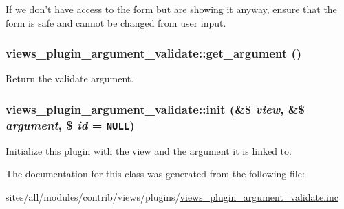 If we don't have access to the form but are showing it anyway, ensure that the form is safe and cannot be changed from user input. \hypertarget{classviews__plugin__argument__validate_a5ce3161f5f33df417719506c1613446}{
\subsubsection[{get\_\-argument}]{\setlength{\rightskip}{0pt plus 5cm}views\_\-plugin\_\-argument\_\-validate::get\_\-argument ()}}
\label{classviews__plugin__argument__validate_a5ce3161f5f33df417719506c1613446}


Return the validate argument. \hypertarget{classviews__plugin__argument__validate_d3a9fbaccf486d38039340ce03fd577a}{
\subsubsection[{init}]{\setlength{\rightskip}{0pt plus 5cm}views\_\-plugin\_\-argument\_\-validate::init (\&\$ {\em view}, \/  \&\$ {\em argument}, \/  \$ {\em id} = {\tt NULL})}}
\label{classviews__plugin__argument__validate_d3a9fbaccf486d38039340ce03fd577a}


Initialize this plugin with the \hyperlink{classview}{view} and the argument it is linked to. 

The documentation for this class was generated from the following file:\begin{CompactItemize}
\item 
sites/all/modules/contrib/views/plugins/\hyperlink{views__plugin__argument__validate_8inc}{views\_\-plugin\_\-argument\_\-validate.inc}\end{CompactItemize}
